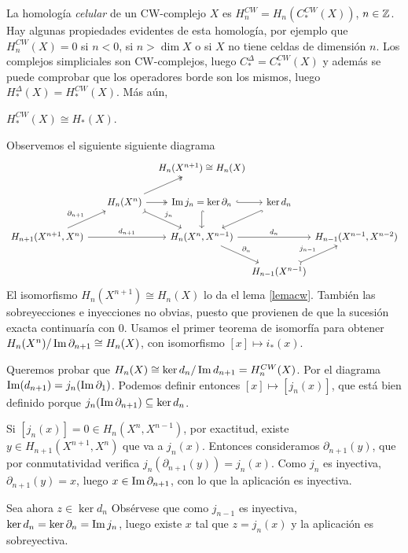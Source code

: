 \documentclass[TA.tex]{subfiles}
\begin{document}
La homología \emph{celular} de un CW-complejo $X$ es $H_n^{CW}=H_n(C_*^{CW}(X))$, $n\in\mathbb{Z}$. Hay algunas propiedades evidentes de esta homología, por ejemplo que $H_n^{CW}(X)=0$ si $n<0$, si $n>\dim X$ o si $X$ no tiene celdas de dimensión $n$. Los complejos simpliciales son CW-complejos, luego $C_*^{\Delta}=C_*^{CW}(X)$ y además se puede comprobar que los operadores borde son los mismos, luego $H_*^{\Delta}(X)=H_*^{CW}(X)$. Más aún, 

\begin{teorema}
$H_*^{CW}(X)\cong H_*(X)$. 
\end{teorema}
\begin{dem}
Observemos el siguiente siguiente diagrama
\[
\begin{tikzcd}[column sep={80,between origins}]
&																		& H_n(X^{n+1})\cong H_n(X) & &\\
&   H_n(X^n)\arrow[dr, rightarrowtail, "j_n"]\arrow[ur,twoheadrightarrow]\arrow[r,twoheadrightarrow]  & \Ima{j_n}=\ker{\partial_n}\arrow[d, hookrightarrow]\arrow[r, hookrightarrow]& \ker{d_n}\arrow[dl, hookrightarrow] &\\
H_{n+1}(X^{n+1},X^n)\arrow[rr, "d_{n+1}"]\arrow[ur, "\partial_{n+1}"] & & H_n(X^n,X^{n-1})\arrow[rr, "d_n"]\arrow[dr,"\partial_n"] & & H_{n-1}(X^{n-1}, X^{n-2})\\
&                                                                       &                    & H_{n-1}(X^{n-1})\arrow[ur, rightarrowtail, "j_{n-1}"]&
\end{tikzcd}
\]
El isomorfismo $H_n(X^{n+1})\cong H_n(X)$ lo da el lema \ref{lemacw}. También las sobreyecciones e inyecciones no obvias, puesto que provienen de que la sucesión exacta continuaría con 0. Usamos el primer teorema de isomorfía para obtener $ H_n(X^n)/\operatorname{Im}{\partial_{n+1}}\cong H_n(X)$, con isomorfismo $[x]\mapsto i_*(x)$. 

Queremos probar que $H_n(X)\cong \ker d_n/\operatorname{Im}{d_{n+1}}=H_n^{CW}(X)$. Por el diagrama $\operatorname{Im}(d_{n+1})=j_n(\operatorname{Im}\partial_1)$. Podemos definir entonces $[x]\mapsto [j_n(x)]$, que está bien definido porque $j_n(\operatorname{Im}\partial_{n+1})\subseteq\ker d_n$. 

Si $[j_n(x)]=0\in H_n(X^n,X^{n-1})$, por exactitud, existe $y\in H_{n+1}(X^{n+1}, X^n)$ que va a $j_n(x)$. Entonces consideramos $\partial_{n+1}(y)$, que por conmutatividad verifica $j_n(\partial_{n+1}(y))=j_n(x)$. Como $j_n$ es inyectiva, $\partial_{n+1}(y)=x$, luego $x\in\operatorname{Im}\partial_{n+1}$, con lo que la aplicación es inyectiva.

Sea ahora $z\in\ker d_n$ Obsérvese que como $j_{n-1}$ es inyectiva, $\ker d_n=\ker\partial_n=\operatorname{Im} j_n$, luego existe $x$ tal que $z=j_n(x)$ y la aplicación es sobreyectiva.
\end{dem}
\end{document}
